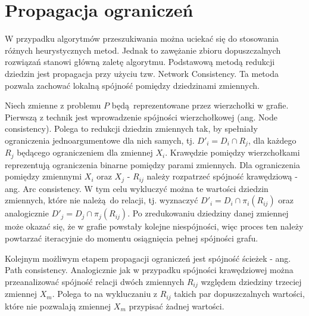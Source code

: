 \section{Propagacja ograniczeń}
W przypadku algorytmów przeszukiwania można uciekać się do stosowania różnych heurystycznych metod. Jednak
to zawężanie zbioru dopuszczalnych rozwiązań stanowi główną zaletę algorytmu. Podstawową metodą redukcji dziedzin
jest propagacja przy użyciu tzw. Network Consistency. Ta metoda pozwala zachować lokalną spójność pomiędzy
dziedzinami zmiennych.
\par
Niech zmienne z problemu $P$ będą reprezentowane przez wierzchołki w grafie. Pierwszą z technik jest wprowadzenie
spójności wierzchołkowej (ang. Node consistency). Polega to redukcji dziedzin zmiennych tak, by spełniały ograniczenia
jednoargumentowe dla nich samych, tj. $D'_i = D_i \cap R_j$, dla każdego $R_j$ będącego ograniczeniem dla zmiennej $X_i$. 
Krawędzie pomiędzy wierzchołkami reprezentują ograniczenia binarne pomiędzy parami zmiennych. Dla ograniczenia pomiędzy
zmiennymi $X_i$ oraz $X_j$ - $R_{ij}$ należy rozpatrzeć spójność krawędziową - ang. Arc consistency.
W tym celu wykluczyć można te wartości dziedzin zmiennych, które nie należą do relacji, tj. wyznaczyć
$D'_i = D_i \cap \pi_i(R_{ij})$ oraz analogicznie $D'_j = D_j \cap \pi_j(R_{ij})$. Po zredukowaniu dziedziny
danej zmiennej może okazać się, że w grafie powstały kolejne niespójności, więc proces ten należy powtarzać iteracyjnie
do momentu osiągnięcia pełnej spójności grafu.
\par
Kolejnym możliwym etapem propagacji ograniczeń jest spójność ścieżek - ang. Path consistency. Analogicznie jak w przypadku
spójności krawędziowej można przeanalizować spójność relacji dwóch zmiennych $R_{ij}$ względem dziedziny trzeciej zmiennej
$X_m$. Polega to na wykluczaniu z $R_{ij}$ takich par dopuszczalnych wartości, które nie pozwalają zmiennej $X_m$
przypisać żadnej wartości.

